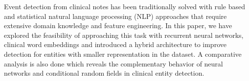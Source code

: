 Event detection from clinical notes has been traditionally solved with rule based and statistical natural language processing (NLP) approaches that require extensive domain knowledge and feature engineering. In this paper, we have explored the feasibility of approaching this task with recurrent neural networks, clinical word embeddings and introduced a hybrid architecture to improve detection for entities with smaller representation in the dataset. A comparative analysis is also done which reveals the complementary behavior of neural networks and conditional random fields in clinical entity detection.
